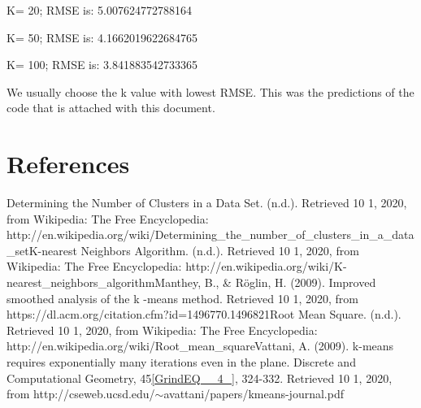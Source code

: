 \documentclass{article} %
\begin{document}
\noindent K= 20; RMSE is: 5.007624772788164

\noindent K= 50; RMSE is: 4.1662019622684765

\noindent K= 100; RMSE is: 3.841883542733365

\noindent We usually choose the k value with lowest RMSE. This was the predictions of the code that is attached with this document.

\noindent 

\noindent 

\noindent 

\noindent 

\noindent \eject 

\noindent 
\section{References}

\noindent Determining the Number of Clusters in a Data Set. (n.d.). Retrieved 10 1, 2020, from Wikipedia: The Free Encyclopedia: http://en.wikipedia.org/wiki/Determining\_the\_number\_of\_clusters\_in\_a\_data\_setK-nearest Neighbors Algorithm. (n.d.). Retrieved 10 1, 2020, from Wikipedia: The Free Encyclopedia: http://en.wikipedia.org/wiki/K-nearest\_neighbors\_algorithmManthey, B., \& R\"{o}glin, H. (2009). Improved smoothed analysis of the k -means method. Retrieved 10 1, 2020, from https://dl.acm.org/citation.cfm?id=1496770.1496821Root Mean Square. (n.d.). Retrieved 10 1, 2020, from Wikipedia: The Free Encyclopedia: http://en.wikipedia.org/wiki/Root\_mean\_squareVattani, A. (2009). k-means requires exponentially many iterations even in the plane. Discrete and Computational Geometry, 45\eqref{GrindEQ__4_}, 324-332. Retrieved 10 1, 2020, from http://cseweb.ucsd.edu/$\mathrm{\sim}$avattani/papers/kmeans-journal.pdf

\noindent 

\noindent 
\end{document}
